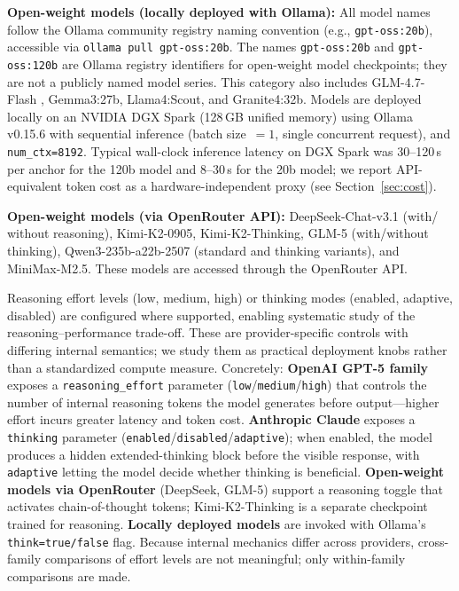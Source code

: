 \documentclass[runningheads]{llncs}
\begin{document}
\textbf{Open-weight models (locally deployed with Ollama):} All model names follow the Ollama community registry naming convention (e.g., \texttt{gpt-oss:20b}), accessible via \texttt{ollama pull gpt-oss:20b}. The names \texttt{gpt-oss:20b} and \texttt{gpt-oss:120b} are Ollama registry identifiers for open-weight model checkpoints; they are not a publicly named model series. This category also includes GLM-4.7-Flash%
, Gemma3:27b, Llama4:Scout, and Granite4:32b. Models are deployed locally on an NVIDIA DGX Spark (128\,GB unified memory) using Ollama v0.15.6 with sequential inference (batch size~$=1$, single concurrent request), and \texttt{num\_ctx=8192}. Typical wall-clock inference latency on DGX Spark was 30--120\,s per anchor for the 120b model and 8--30\,s for the 20b model; we report API-equivalent token cost as a hardware-independent proxy (see Section~\ref{sec:cost}).

\textbf{Open-weight models (via OpenRouter API):} DeepSeek-Chat-v3.1 (with/ without reasoning), Kimi-K2-0905, Kimi-K2-Thinking, GLM-5 (with/without thinking), Qwen3-235b-a22b-2507 (standard and thinking variants), and MiniMax-M2.5. These models are accessed through the OpenRouter API.

Reasoning effort levels (low, medium, high) or thinking modes (enabled, adaptive, disabled) are configured where supported, enabling systematic study of the reasoning--performance trade-off. These are provider-specific controls with differing internal semantics; we study them as practical deployment knobs rather than a standardized compute measure. Concretely: \textbf{OpenAI GPT-5 family} exposes a \texttt{reasoning\_effort} parameter (\texttt{low}/\texttt{medium}/\texttt{high}) that controls the number of internal reasoning tokens the model generates before output---higher effort incurs greater latency and token cost. \textbf{Anthropic Claude} exposes a \texttt{thinking} parameter (\texttt{enabled}/\texttt{disabled}/\texttt{adaptive}); when enabled, the model produces a hidden extended-thinking block before the visible response, with \texttt{adaptive} letting the model decide whether thinking is beneficial. \textbf{Open-weight models via OpenRouter} (DeepSeek, GLM-5) support a reasoning toggle that activates chain-of-thought tokens; Kimi-K2-Thinking is a separate checkpoint trained for reasoning. \textbf{Locally deployed models} are invoked with Ollama's \texttt{think=true/false} flag. Because internal mechanics differ across providers, cross-family comparisons of effort levels are not meaningful; only within-family comparisons are made.
\end{document}
